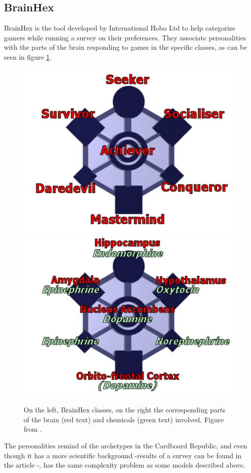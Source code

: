 \subsection{BrainHex}
BrainHex is the tool developed by International Hobo Ltd to help categorize gamers while running a survey on their preferences.
They associate personalities with the parts of the brain responding to games in the specific classes, as can be seen in figure \ref{fig:brainhex}. 
\begin{figure}[ht]
    \centering
    \includegraphics[scale=0.3]{figure/BrainHex_Classes.png}
    \includegraphics[scale=0.3]{figure/BrainHex_Brain.png}
    \captionsetup{justification=centering}
    \caption{On the left, BrainHex classes, on the right the corresponding parts of the brain (red text) and chemicals (green text) involved. Figure from \cite{nacke2011brainhex}.}
    \label{fig:brainhex}
\end{figure}
The personalities remind of the archetypes in the Cardboard Republic, and even though it has a more scientific background -results of a survey can be found in the article \cite{nacke2011brainhex}-, has the same complexity problem as some models described above.
